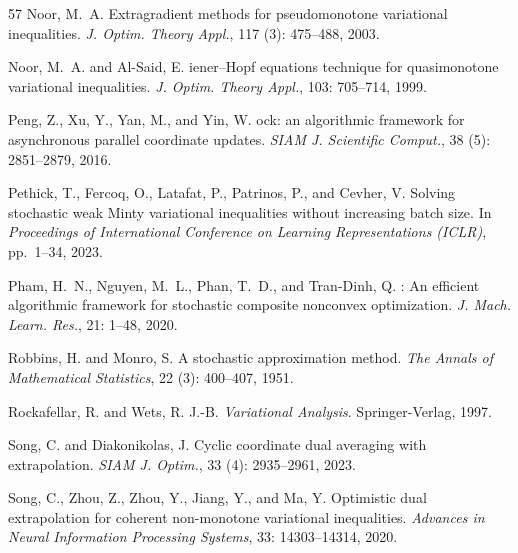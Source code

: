 \documentclass{article}
\theoremstyle{plain}
\theoremstyle{definition}
\theoremstyle{remark}
\begin{document}
\begin{thebibliography}{57}
Noor, M.~A.
\newblock Extragradient methods for pseudomonotone variational inequalities.
\newblock \emph{J. Optim. Theory Appl.}, 117 (3): 475--488,
  2003.

Noor, M.~A. and Al-Said, E.
iener--{H}opf equations technique for quasimonotone variational
  inequalities.
\newblock \emph{J. Optim. Theory Appl.}, 103: 705--714, 1999.

Peng, Z., Xu, Y., Yan, M., and Yin, W.
ock: an algorithmic framework for asynchronous parallel
  coordinate updates.
\newblock \emph{SIAM J. Scientific Comput.}, 38 (5):
  2851--2879, 2016.

Pethick, T., Fercoq, O., Latafat, P., Patrinos, P., and Cevher, V.
\newblock Solving stochastic weak {M}inty variational inequalities without
  increasing batch size.
\newblock In \emph{Proceedings of International Conference on Learning
  Representations (ICLR)}, pp.\  1--34, 2023.

Pham, H.~N., Nguyen, M.~L., Phan, T.~D., and Tran-Dinh, Q.
: {A}n efficient algorithmic framework for stochastic
  composite nonconvex optimization.
\newblock \emph{J. Mach. Learn. Res.}, 21: 1--48, 2020.

Robbins, H. and Monro, S.
\newblock A stochastic approximation method.
\newblock \emph{The Annals of Mathematical Statistics}, 22
  (3): 400--407, 1951.

Rockafellar, R. and Wets, R. J.-B.
\newblock \emph{{V}ariational {A}nalysis}.
\newblock Springer-Verlag, 1997.

Song, C. and Diakonikolas, J.
\newblock Cyclic coordinate dual averaging with extrapolation.
\newblock \emph{SIAM J. Optim.}, 33 (4): 2935--2961, 2023.

Song, C., Zhou, Z., Zhou, Y., Jiang, Y., and Ma, Y.
\newblock Optimistic dual extrapolation for coherent non-monotone variational
  inequalities.
\newblock \emph{Advances in Neural Information Processing Systems},
  33: 14303--14314, 2020.


\end{thebibliography}
\end{document}
